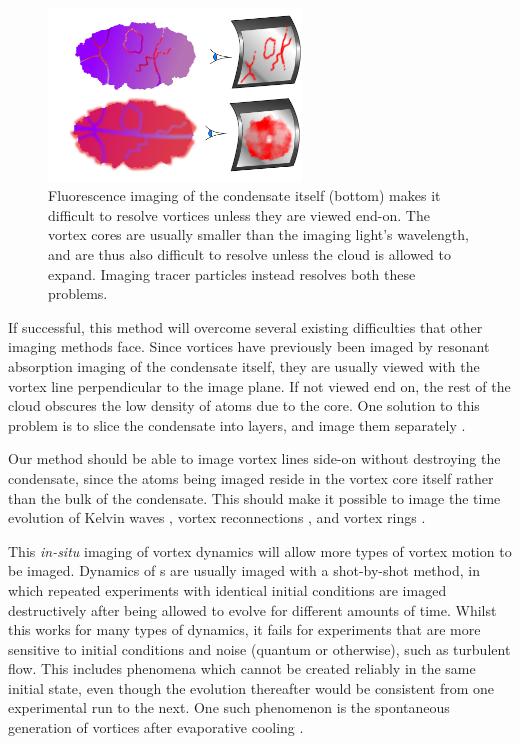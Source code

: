 \begin{figure}
\begin{center}
\includegraphics[width=0.6\textwidth]{figures/unsorted/side-on.pdf}
\caption{\label{fig:side-on}Fluorescence imaging of the condensate itself (bottom) makes it difficult to resolve vortices unless they are viewed end-on. The vortex cores are usually smaller than the imaging light's wavelength, and are thus also difficult to resolve unless the cloud is allowed to expand. Imaging tracer particles instead resolves both these problems.}
\end{center}
\end{figure}

If successful, this method will overcome several existing difficulties that other imaging methods face. Since vortices have previously been imaged by resonant absorption imaging of the condensate itself, they are usually viewed with the vortex line perpendicular to the image plane. If not viewed end on, the rest of the cloud obscures the low density of atoms due to the core. One solution to this problem is to slice the condensate into layers, and image them separately \cite{anderson_watching_2001}.

Our method should be able to image vortex lines side-on without destroying the condensate, since the atoms being imaged reside in the vortex core itself rather than the bulk of the condensate. This should make it possible to image the time evolution of Kelvin waves \cite{bretin_quadrupole_2003}, vortex reconnections \cite{leadbeater_sound_2001}, and vortex rings \cite{anderson_watching_2001}.

This \emph{in-situ} imaging of vortex dynamics will allow more types of vortex motion to be imaged. Dynamics of \bec s are usually imaged with a shot-by-shot method, in which repeated experiments with identical initial conditions are imaged destructively after being allowed to evolve for different amounts of time. Whilst this works for many types of dynamics, it fails for experiments that are more sensitive to initial conditions and noise (quantum or otherwise), such as turbulent flow. This includes phenomena which cannot be created reliably in the same initial state, even though the evolution thereafter would be consistent from one experimental run to the next. One such phenomenon is the spontaneous generation of vortices after evaporative cooling \cite{weiler_spontaneous_2008}.


